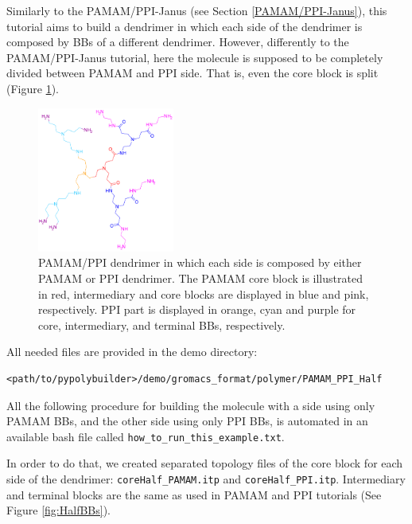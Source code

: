 
Similarly to the PAMAM/PPI-Janus (see Section \ref{PAMAM/PPI-Janus}), this tutorial aims to build a dendrimer in which each side of the dendrimer is composed by BBs of a different dendrimer.
However, differently to the PAMAM/PPI-Janus tutorial, here the molecule is supposed to be completely divided between PAMAM and PPI side.
That is, even the core block is split (Figure \ref{fig:Half}).

\begin{figure}
    \centering
    \includegraphics[width=0.4\textwidth]{PAMAM_PPI-half/PAMAMPPIPOL.png}
    \caption{PAMAM/PPI dendrimer in which each side is composed by either PAMAM or PPI dendrimer. The PAMAM core block is illustrated in red, intermediary and core blocks are displayed in blue and pink, respectively. PPI part is displayed in orange, cyan and purple for core, intermediary, and terminal BBs, respectively. }
    \label{fig:Half}
\end{figure}

All needed files are provided in the demo directory:

\begin{lstlisting}
<path/to/pypolybuilder>/demo/gromacs_format/polymer/PAMAM_PPI_Half
\end{lstlisting}

All the following procedure for building the molecule with a side using only PAMAM BBs, and the other side using only PPI BBs, is automated in an available bash file called \texttt{how\_to\_run\_this\_example.txt}.

In order to do that, we created separated topology files of the core block for each side of the dendrimer: \texttt{coreHalf\_PAMAM.itp} and \texttt{coreHalf\_PPI.itp}.
Intermediary and terminal blocks are the same as used in PAMAM and PPI tutorials (See Figure \ref{fig:HalfBBs}).


